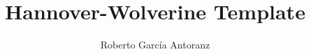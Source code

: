 \documentclass[11pt]{beamer}
\author{Roberto García Antoranz}
\title{Hannover-Wolverine Template}
\begin{document}
\begin{frame}
\titlepage
\end{frame}
\end{document}
